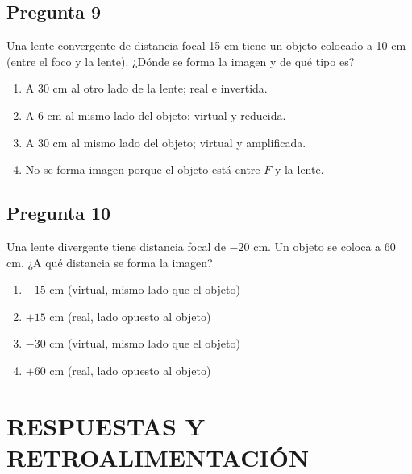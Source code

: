 \begin{preguntabox}
\subsection*{Pregunta 9}
Una lente convergente de distancia focal 15 cm tiene un objeto colocado a 10 cm (entre el foco y la lente). ¿Dónde se forma la imagen y de qué tipo es?

\begin{enumerate}
    \item[A)] A 30 cm al otro lado de la lente; real e invertida.
    \item[B)] A 6 cm al mismo lado del objeto; virtual y reducida.
    \item[C)] A 30 cm al mismo lado del objeto; virtual y amplificada.
    \item[D)] No se forma imagen porque el objeto está entre $F$ y la lente.
\end{enumerate}
\end{preguntabox}

\begin{preguntabox}
\subsection*{Pregunta 10}
Una lente divergente tiene distancia focal de $-20$ cm. Un objeto se coloca a 60 cm. ¿A qué distancia se forma la imagen?

\begin{enumerate}
    \item[A)] $-15$ cm (virtual, mismo lado que el objeto)
    \item[B)] $+15$ cm (real, lado opuesto al objeto)
    \item[C)] $-30$ cm (virtual, mismo lado que el objeto)
    \item[D)] $+60$ cm (real, lado opuesto al objeto)
\end{enumerate}
\end{preguntabox}


\newpage
\onecolumn
\section*{RESPUESTAS Y RETROALIMENTACIÓN}

